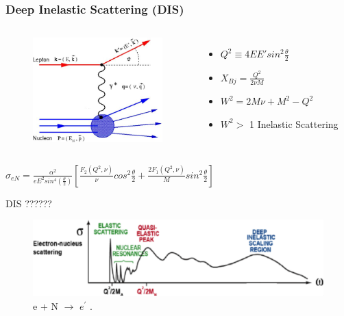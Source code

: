 \documentclass[12pt]{beamer}
\begin{document}
\begin{frame}
\frametitle{Deep Inelastic Scattering (DIS)}
\vspace*{-20pt}
\begin{columns}[c] %
	\begin{figure}
		\includegraphics[width =5cm]{../images/DIS.pdf}
	\end{figure}
	\begin{itemize}
		\item $ Q^2 \equiv 4EE' sin^2 \frac{\theta}{2} $
		\item $X_{Bj}= \frac{Q^2}{2\nu M}$
		\item  $W^2 = 2M\nu + M^2 - Q^2$
		\item $W^2 >$ 1 Inelastic Scattering  
	\end{itemize}
\end{columns}
	\vspace*{10pt}
	\centering
	\Large	$\sigma_{eN} = \frac{\alpha^2}{eE^2sin^4(\frac{\theta}{2})} [\frac{F_2(Q^2,\nu)}{\nu}cos^2\frac{\theta}{2} + \frac{2F_1(Q^2,\nu)}{M}sin^2\frac{\theta}{2}] $	
\end{frame}

\begin{frame}
\begin{block}{DIS ??????}
	\begin{figure}[]
		\centering
		\textbf{ }\par\medskip
		\includegraphics[width=12cm]{../images/Thesis/E_nucleus_spect.pdf}
		\vspace{20pt}
		\caption*{e + N $\rightarrow$ $e^{\prime}$ \cite{deltaIsobar}.}
		\label{wspect}
	\end{figure}

\end{block}
\end{frame}
\end{document}
